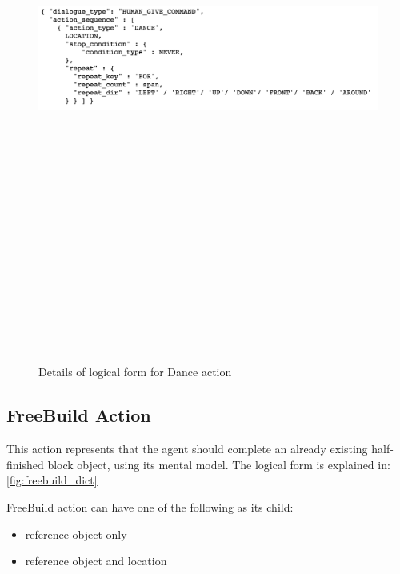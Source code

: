 \begin{figure}[h]
    \centering
    \includegraphics[width=15cm,height=20cm,keepaspectratio]{figures/dance.png}
    \caption{Details of logical form for Dance action}
    \label{fig:dance_dict}
\end{figure}

\subsection{FreeBuild Action}
This action represents that the agent should complete an already existing half-finished block object, using its mental model. The logical form is explained in: \ref{fig:freebuild_dict}

FreeBuild action can have one of the following as its child:
\begin{itemize}
	\setlength\itemsep{0.0em}
	\item reference object only
	\item reference object and location
\end{itemize}

